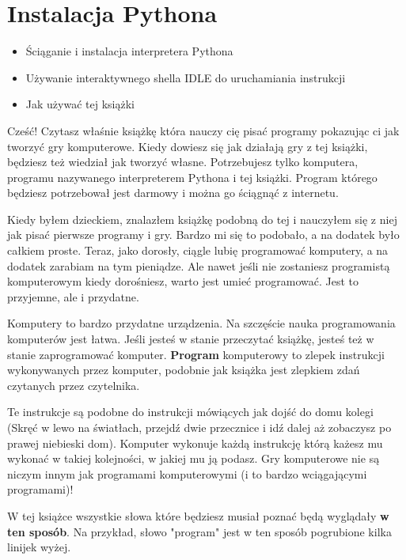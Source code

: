 \documentclass{book}
\newcommand{\btopicscovered}{
	\begin{graybox}
	\begin{itemize}
}
\newcommand{\etopicscovered}{
	\end{itemize}
	\end{graybox}
}
\begin{document}
\chapter{Instalacja Pythona}
\btopicscovered
	\item Ściąganie i instalacja interpretera Pythona
	\item Używanie interaktywnego shella IDLE do uruchamiania instrukcji
	\item Jak używać tej książki
\etopicscovered



Cześć! Czytasz właśnie książkę która nauczy cię pisać programy pokazując ci jak tworzyć gry komputerowe. Kiedy dowiesz się jak działają gry z tej książki, będziesz też wiedział jak tworzyć własne. Potrzebujesz tylko komputera, programu nazywanego interpreterem Pythona i tej książki. Program którego będziesz potrzebował jest darmowy i można go ściągnąć z internetu.

Kiedy byłem dzieckiem, znalazłem książkę podobną do tej i nauczyłem się z niej jak pisać pierwsze programy i gry. Bardzo mi się to podobało, a na dodatek było całkiem proste. Teraz, jako dorosły, ciągle lubię programować komputery, a na dodatek zarabiam na tym pieniądze. Ale nawet jeśli nie zostaniesz programistą komputerowym kiedy dorośniesz, warto jest umieć programować. Jest to przyjemne, ale i przydatne.

Komputery to bardzo przydatne urządzenia. Na szczęście nauka programowania komputerów jest łatwa. Jeśli jesteś w stanie przeczytać książkę, jesteś też w stanie zaprogramować komputer. {\bf Program} komputerowy to zlepek instrukcji wykonywanych przez komputer, podobnie jak książka jest zlepkiem zdań czytanych przez czytelnika.

Te instrukcje są podobne do instrukcji mówiących jak dojść do domu kolegi (Skręć w lewo na światłach, przejdź dwie przecznice i idź dalej aż zobaczysz po prawej niebieski dom). Komputer wykonuje każdą instrukcję którą każesz mu wykonać w takiej kolejności, w jakiej mu ją podasz. Gry komputerowe nie są niczym innym jak programami komputerowymi (i to bardzo wciągającymi programami)!

W tej książce wszystkie słowa które będziesz musiał poznać będą wyglądały {\bf w ten sposób}. Na przykład, słowo "program" jest w ten sposób pogrubione kilka linijek wyżej.
\end{document}
